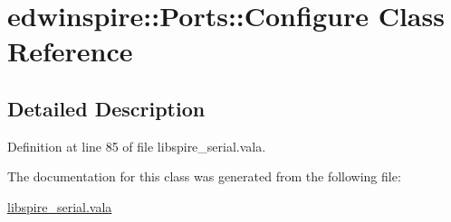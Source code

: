 \hypertarget{classedwinspire_1_1Ports_1_1Configure}{\section{edwinspire\-:\-:Ports\-:\-:Configure Class Reference}
\label{classedwinspire_1_1Ports_1_1Configure}
}


\subsection{Detailed Description}


Definition at line 85 of file libspire\-\_\-serial.\-vala.



The documentation for this class was generated from the following file\-:\begin{DoxyCompactItemize}
\item 
\hyperlink{libspire__serial_8vala}{libspire\-\_\-serial.\-vala}\end{DoxyCompactItemize}
